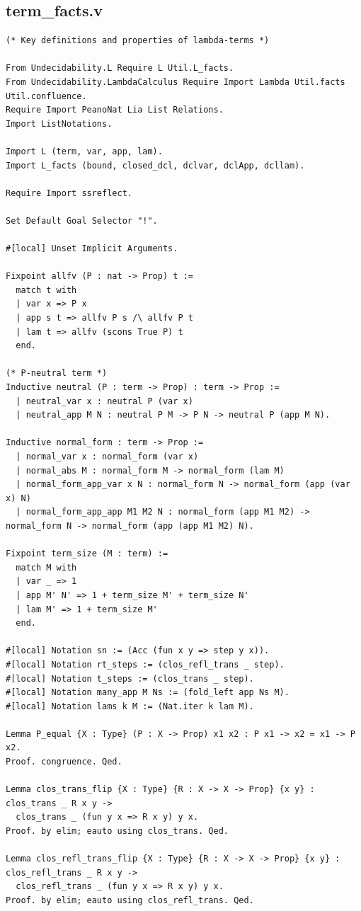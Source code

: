 \subsection*{term\_facts.v}
\begin{lstlisting}
(* Key definitions and properties of lambda-terms *)

From Undecidability.L Require L Util.L_facts.
From Undecidability.LambdaCalculus Require Import Lambda Util.facts Util.confluence.
Require Import PeanoNat Lia List Relations.
Import ListNotations.

Import L (term, var, app, lam).
Import L_facts (bound, closed_dcl, dclvar, dclApp, dcllam).

Require Import ssreflect.

Set Default Goal Selector "!".

#[local] Unset Implicit Arguments.

Fixpoint allfv (P : nat -> Prop) t := 
  match t with
  | var x => P x
  | app s t => allfv P s /\ allfv P t
  | lam t => allfv (scons True P) t
  end.

(* P-neutral term *)
Inductive neutral (P : term -> Prop) : term -> Prop :=
  | neutral_var x : neutral P (var x)
  | neutral_app M N : neutral P M -> P N -> neutral P (app M N).

Inductive normal_form : term -> Prop :=
  | normal_var x : normal_form (var x)
  | normal_abs M : normal_form M -> normal_form (lam M)
  | normal_form_app_var x N : normal_form N -> normal_form (app (var x) N)
  | normal_form_app_app M1 M2 N : normal_form (app M1 M2) -> normal_form N -> normal_form (app (app M1 M2) N).

Fixpoint term_size (M : term) :=
  match M with
  | var _ => 1
  | app M' N' => 1 + term_size M' + term_size N'
  | lam M' => 1 + term_size M'
  end.

#[local] Notation sn := (Acc (fun x y => step y x)).
#[local] Notation rt_steps := (clos_refl_trans _ step).
#[local] Notation t_steps := (clos_trans _ step).
#[local] Notation many_app M Ns := (fold_left app Ns M).
#[local] Notation lams k M := (Nat.iter k lam M).

Lemma P_equal {X : Type} (P : X -> Prop) x1 x2 : P x1 -> x2 = x1 -> P x2.
Proof. congruence. Qed.

Lemma clos_trans_flip {X : Type} {R : X -> X -> Prop} {x y} : clos_trans _ R x y ->
  clos_trans _ (fun y x => R x y) y x.
Proof. by elim; eauto using clos_trans. Qed.

Lemma clos_refl_trans_flip {X : Type} {R : X -> X -> Prop} {x y} : clos_refl_trans _ R x y ->
  clos_refl_trans _ (fun y x => R x y) y x.
Proof. by elim; eauto using clos_refl_trans. Qed.


\end{lstlisting}
